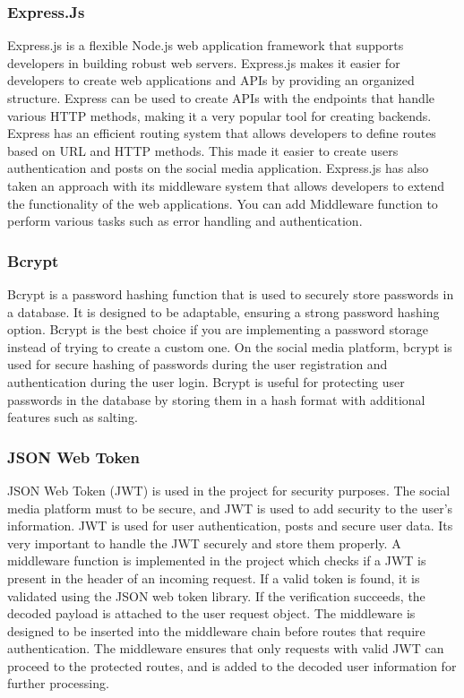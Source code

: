 \subsubsection{Express.Js}
Express.js is a flexible Node.js web application framework that supports developers in building robust web servers. Express.js makes it easier for developers to create web applications and APIs by providing an organized structure. Express can be used to create APIs with the endpoints that handle various HTTP methods, making it a very popular tool for creating backends. Express has an efficient routing system that allows developers to define routes based on URL and HTTP methods. This made it easier to create users authentication and posts on the social media application. Express.js has also taken an approach with its middleware system that allows developers to extend the functionality of the web applications. You can add Middleware function to perform various tasks such as error handling and authentication.

\subsubsection{Bcrypt}
Bcrypt is a password hashing function that is used to securely store passwords in a database. It is designed to be adaptable, ensuring a strong password hashing option. Bcrypt is the best choice if you are implementing a password storage instead of trying to create a custom one. On the social media platform, bcrypt is used for secure hashing of passwords during the user registration and authentication during the user login. Bcrypt is useful for protecting user passwords in the database by storing them in a hash format with additional features such as salting.

\subsubsection{JSON Web Token}
JSON Web Token (JWT) is used in the project for security purposes. The
social media platform must to be secure, and JWT is used to add security to the user's information. JWT is used for user authentication, posts and secure user data. Its very important to handle the JWT securely and store them properly. A middleware function is implemented in the project which checks if a JWT is present in the header of an incoming request. If a valid token is found, it is validated using the JSON web token library. If the verification succeeds, the decoded payload is attached to the user request object. The middleware is designed to be inserted into the middleware chain before routes that require authentication. The middleware ensures that only requests with valid JWT can proceed to the protected routes, and is added to the decoded user information for further processing.

